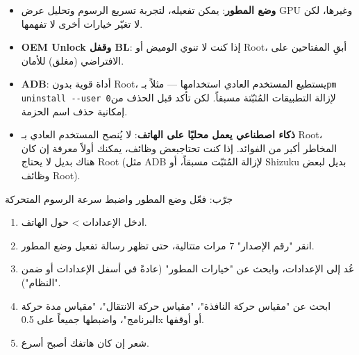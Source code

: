 
\begin{itemize}
  \item \textbf{وضع المطور}: يمكن تفعيله، لتجربة تسريع الرسوم وتحليل عرض GPU وغيرها، لكن لا تغيّر خيارات أخرى لا تفهمها.
  \item \textbf{OEM Unlock وقفل BL}: إذا كنت لا تنوي الوميض أو Root، أبقِ المفتاحين على الافتراضي (مغلق) للأمان.
  \item \textbf{ADB}: أداة قوية بدون Root، يستطيع المستخدم العادي استخدامها — مثلاً بـ\texttt{pm uninstall -\allowbreak -\allowbreak user 0}لإزالة التطبيقات المُثبّتة مسبقاً. لكن تأكد قبل الحذف من إمكانية حذف اسم الحزمة.
  \item \textbf{ذكاء اصطناعي يعمل محليًا على الهاتف}: لا يُنصح المستخدم العادي بـ Root، المخاطر أكبر من الفوائد. إذا كنت تحتاجبعض وظائف، يمكنك أولاً معرفة إن كان هناك بديل لا يحتاج Root (مثل ADB لإزالة المُثبّت مسبقاً، أو Shizuku بديل لبعض وظائف Root).
\end{itemize}

\begin{tcbpractice}{جرّب: فعّل وضع المطور واضبط سرعة الرسوم المتحركة}
\begin{enumerate}
  \item ادخل الإعدادات > حول الهاتف.
  \item انقر "رقم الإصدار" 7 مرات متتالية، حتى تظهر رسالة تفعيل وضع المطور.
  \item عُد إلى الإعدادات، وابحث عن "خيارات المطور" (عادةً في أسفل الإعدادات أو ضمن "النظام").
  \item ابحث عن "مقياس حركة النافذة"، "مقياس حركة الانتقال"، "مقياس مدة حركة البرنامج"، واضبطها جميعاً على 0.5x أو أوقفها.
  \item شعر إن كان هاتفك أصبح أسرع.
\end{enumerate}

\end{tcbpractice}
